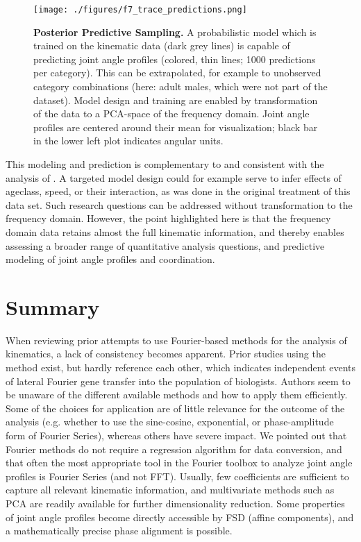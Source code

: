 \documentclass[10pt,a4paper]{article}
\begin{document}
\begin{figure}[pt]
\centering
\texttt{[image: ./figures/f7\_trace\_predictions.png]}
\caption{\label{fig:modelprediction}\textbf{Posterior Predictive Sampling.} A probabilistic model which is trained on the kinematic data (dark grey lines) is capable of predicting joint angle profiles (colored, thin lines; 1000 predictions per category). This can be extrapolated, for example to unobserved category combinations (here: adult males, which were not part of the dataset). Model design and training are enabled by transformation of the data to a PCA-space of the frequency domain. Joint angle profiles are centered around their mean for visualization; black bar in the lower left plot indicates angular units.}
\end{figure}


This modeling and prediction is complementary to and consistent with the analysis of \citet{Druelle2021}.
A targeted model design could for example serve to infer effects of ageclass, speed, or their interaction, as was done in the original treatment of this data set.
Such research questions can be addressed without transformation to the frequency domain.
However, the point highlighted here is that the frequency domain data retains almost the full kinematic information, and thereby enables assessing a broader range of quantitative analysis questions, and predictive modeling of joint angle profiles and coordination.

\FloatBarrier\clearpage
\section{Summary}
\label{summary}
When reviewing prior attempts to use Fourier-based methods for the analysis of kinematics, a lack of consistency becomes apparent.
Prior studies using the method exist, but hardly reference each other, which indicates independent events of lateral Fourier gene transfer into the population of biologists.
Authors seem to be unaware of the different available methods and how to apply them efficiently.
Some of the choices for application are of little relevance for the outcome of the analysis (e.g. whether to use the sine-cosine, exponential, or phase-amplitude form of Fourier Series), whereas others have severe impact.
We pointed out that Fourier methods do not require a regression algorithm for data conversion, and that often the most appropriate tool in the Fourier toolbox to analyze joint angle profiles is Fourier Series (and not FFT).
Usually, few coefficients are sufficient to capture all relevant kinematic information, and multivariate methods such as PCA are readily available for further dimensionality reduction.
Some properties of joint angle profiles become directly accessible by FSD (affine components), and a mathematically precise phase alignment is possible.
\end{document}
